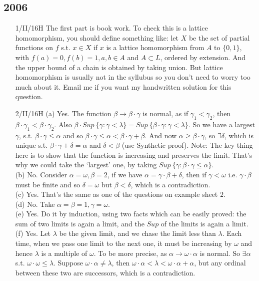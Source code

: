 \subsection{2006}
\begin{enumerate}
\item[1/II/16H] The first part is book work. To check this is a lattice homomorphism, you should define something like: let $X$ be the set of partial functions on $f$ s.t. $x \in X$ if $x$ is a lattice homomorphism from $A$ to $\{0,1\}$, with $f(a)=0,f(b)=1, a,b \in A$ and $A \subset L$, ordered by extension. And the upper bound of a chain is obtained by taking union. But lattice homomorphism is usually not in the syllubus so you don't need to worry too much about it. Email me if you want my handwritten solution for this question.\\
\item[2/II/16H] (a) Yes. The function $\beta \rightarrow \beta \cdot \gamma$ is normal, as if $\gamma_1 <\gamma_2$, then $\beta \cdot \gamma_1 < \beta \cdot \gamma_2$. Also $\beta \cdot Sup~\{\gamma: \gamma <\lambda\}= Sup~\{\beta \cdot \gamma: \gamma < \lambda\}$. So we have a largest $\gamma$, s.t. $\beta \cdot \gamma \le \alpha$ and so $\beta \cdot \gamma \le \alpha < \beta \cdot \gamma +\beta$. And now $\alpha \ge \beta \cdot \gamma$, so $\exists \delta$, which is unique s.t. $\beta \cdot \gamma +\delta =\alpha$ and $\delta < \beta$ (use Synthetic proof). Note: The key thing here is to show that the function is increasing and preserves the limit. That's why we could take the `largest' one, by taking $Sup~\{\gamma: \beta \cdot \gamma \le \alpha\}$.\\
    (b) No. Consider $\alpha=\omega, \beta=2$, if we have $\alpha=\gamma \cdot \beta+\delta$, then if $\gamma < \omega$ i.e. $\gamma \cdot \beta$ must be finite and so $\delta =\omega$ but $\beta < \delta$, which is a contradiction.\\
    (c) Yes. That's the same as one of the questions on example sheet $2$.\\
    (d) No. Take $\alpha=\beta=1, \gamma =\omega$.\\
    (e) Yes. Do it by induction, using two facts which can be easily proved: the sum of two limits is again a limit, and the $Sup$ of the limits is again a limit.\\
    (f) Yes. Let $\lambda$ be the given limit, and we chase the limit less than $\lambda$. Each time, when we pass one limit to the next one, it must be increasing by $\omega$ and hence $\lambda$ is a multiple of $\omega$. To be more precise, as $\alpha \rightarrow \omega \cdot \alpha$ is normal. So $\exists \alpha$ s.t. $\omega \cdot \omega \le \lambda$. Suppose $\omega \cdot \alpha \neq \lambda$, then $\omega \cdot \alpha < \lambda < \omega \cdot \alpha+\alpha$, but any ordinal between these two are successors, which is a contradiction.\\

\end{enumerate}
